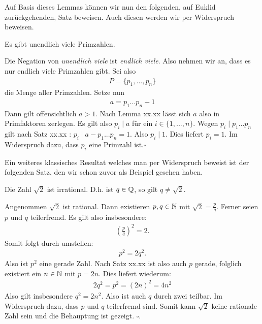 Auf Basis dieses Lemmas können wir nun den folgenden, auf Euklid zurückgehenden, Satz beweisen. Auch diesen werden wir per Widerspruch beweisen. 

\begin{theorem}
    Es gibt unendlich viele Primzahlen. 
\end{theorem}

\begin{proof*}
    Die Negation von \textit{unendlich viele} ist \textit{endlich viele}. Also nehmen wir an, dass es nur endlich viele Primzahlen gibt. Sei also 
    \begin{align*}
        P = \{p_1,...,p_n\}
    \end{align*}
    die Menge aller Primzahlen. Setze nun
    \begin{align*}
        a = p_1 ... p_n + 1 
    \end{align*}
    Dann gilt offensichtlich $a>1$. Nach Lemma xx.xx lässt sich $a$ also in Primfaktoren zerlegen. Es gilt also $p_i \mid a$ für ein $i \in \{1,...,n\}$. 
    Wegen $p_i \mid p_1 ... p_n$ gilt nach Satz xx.xx : $p_i \mid a - p_1 ... p_n = 1$. Also $p_i \mid 1$. Dies liefert $p_i = 1$. Im Widerspruch dazu, dass $p_i$ eine Primzahl ist.\hfill $\square$ 
\end{proof*}

Ein weiteres klassisches Resultat welches man per Widerspruch beweist ist der folgenden Satz, den wir schon zuvor als Beispiel gesehen haben. 
\begin{theorem}
    Die Zahl $\sqrt{2}$ ist irrational. D.h. ist $q \in \mathbb{Q}$, so gilt $q \neq \sqrt{2}$. 
\end{theorem}
\begin{proof*}
    Angenommen $\sqrt{2}$ ist rational. Dann existieren $p,q \in \mathbb{N}$ mit $\sqrt{2} = \frac{p}{q}$. Ferner seien $p$ und $q$ teilerfremd. 
    Es gilt also insbesondere: 
    \begin{align*}
        (\frac{p}{q})^2 = 2 . 
    \end{align*}
    Somit folgt durch umstellen: 
    \begin{align*}
        p^2 = 2q^2.
    \end{align*}
    Also ist $p^2$ eine gerade Zahl. Nach Satz xx.xx ist also auch $p$ gerade, folglich existiert ein $n \in \mathbb{N}$ mit $p = 2n$. 
    Dies liefert wiederum: 
    \begin{align*}
        2q^2 = p^2 = (2n)^2 = 4n^2
    \end{align*}
    Also gilt insbesondere $q^2 = 2n^2$. Also ist auch $q$ durch zwei teilbar. Im Widerspruch dazu, dass $p$ und $q$ teilerfremd sind. 
    Somit kann $\sqrt{2}$ keine rationale Zahl sein und die Behauptung ist gezeigt. \hfill $\square$. 

\end{proof*}

